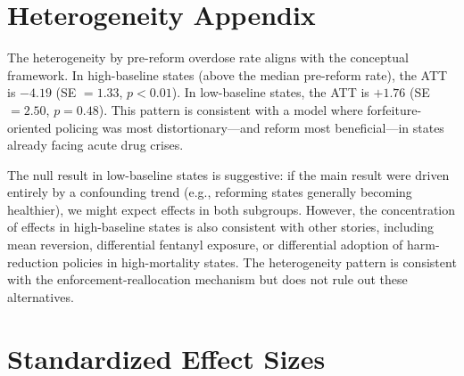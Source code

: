 \documentclass[12pt]{article}
\begin{document}
\section{Heterogeneity Appendix}
\label{app:het}

The heterogeneity by pre-reform overdose rate aligns with the conceptual framework. In high-baseline states (above the median pre-reform rate), the ATT is $-4.19$ (SE $= 1.33$, $p < 0.01$). In low-baseline states, the ATT is $+1.76$ (SE $= 2.50$, $p = 0.48$). This pattern is consistent with a model where forfeiture-oriented policing was most distortionary---and reform most beneficial---in states already facing acute drug crises.

The null result in low-baseline states is suggestive: if the main result were driven entirely by a confounding trend (e.g., reforming states generally becoming healthier), we might expect effects in both subgroups. However, the concentration of effects in high-baseline states is also consistent with other stories, including mean reversion, differential fentanyl exposure, or differential adoption of harm-reduction policies in high-mortality states. The heterogeneity pattern is consistent with the enforcement-reallocation mechanism but does not rule out these alternatives.




\section{Standardized Effect Sizes}
\label{sec:sde}
\end{document}
